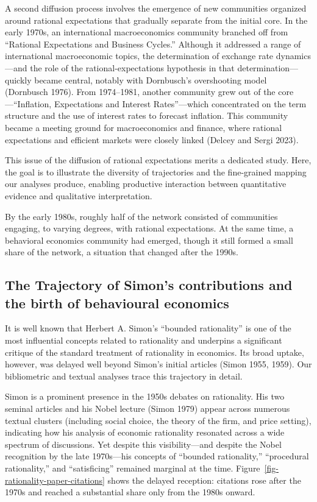 \documentclass[
]{interact}
\begin{document}
A second diffusion process involves the emergence of new communities
organized around rational expectations that gradually separate from the
initial core. In the early 1970s, an international macroeconomics
community branched off from ``Rational Expectations and Business
Cycles.'' Although it addressed a range of international macroeconomic
topics, the determination of exchange rate dynamics---and the role of
the rational-expectations hypothesis in that determination---quickly
became central, notably with Dornbusch's overshooting model (Dornbusch
1976). From 1974--1981, another community grew out of the
core---``Inflation, Expectations and Interest Rates''---which
concentrated on the term structure and the use of interest rates to
forecast inflation. This community became a meeting ground for
macroeconomics and finance, where rational expectations and efficient
markets were closely linked (Delcey and Sergi 2023).

This issue of the diffusion of rational expectations merits a dedicated
study. Here, the goal is to illustrate the diversity of trajectories and
the fine-grained mapping our analyses produce, enabling productive
interaction between quantitative evidence and qualitative
interpretation.

By the early 1980s, roughly half of the network consisted of communities
engaging, to varying degrees, with rational expectations. At the same
time, a behavioral economics community had emerged, though it still
formed a small share of the network, a situation that changed after the
1990s.

\subsection{The Trajectory of Simon's contributions and the birth of
behavioural
economics}\label{the-trajectory-of-simons-contributions-and-the-birth-of-behavioural-economics}

It is well known that Herbert A. Simon's ``bounded rationality'' is one
of the most influential concepts related to rationality and underpins a
significant critique of the standard treatment of rationality in
economics. Its broad uptake, however, was delayed well beyond Simon's
initial articles (Simon 1955, 1959). Our bibliometric and textual
analyses trace this trajectory in detail.

Simon is a prominent presence in the 1950s debates on rationality. His
two seminal articles and his Nobel lecture (Simon 1979) appear across
numerous textual clusters (including social choice, the theory of the
firm, and price setting), indicating how his analysis of economic
rationality resonated across a wide spectrum of discussions. Yet despite
this visibility---and despite the Nobel recognition by the late
1970s---his concepts of ``bounded rationality,'' ``procedural
rationality,'' and ``satisficing'' remained marginal at the time.
Figure~\ref{fig-rationality-paper-citations} shows the delayed
reception: citations rose after the 1970s and reached a substantial
share only from the 1980s onward.
\end{document}
